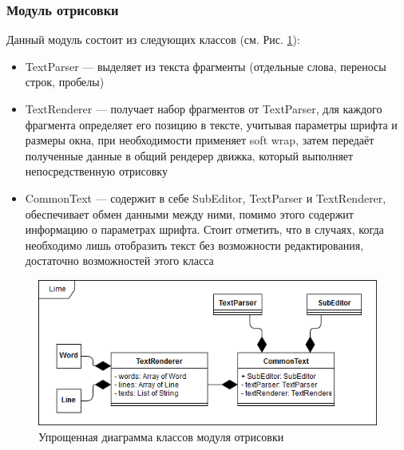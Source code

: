 \documentclass{fefu}
\begin{document}
			\subsubsection{Модуль отрисовки}
				\par Данный модуль состоит из следующих классов (см. Рис. 
				\ref{diag:RendererScheme}):
				\begin{itemize}
					\item TextParser --- выделяет из текста фрагменты (отдельные слова, 
					переносы строк, пробелы)
					\item TextRenderer --- получает набор фрагментов от TextParser, для каждого
					фрагмента определяет его позицию в тексте, учитывая параметры шрифта и 
					размеры окна, при необходимости применяет soft wrap, затем передаёт
					полученные данные в общий рендерер движка, который выполняет
					непосредственную отрисовку
					\item CommonText --- содержит в себе SubEditor, TextParser и TextRenderer,
					обеспечивает обмен данными между ними, помимо этого содержит информацию о
					параметрах шрифта. Стоит отметить, что в случаях, когда необходимо лишь 
					отобразить текст без возможности редактирования, достаточно возможностей
					этого класса
				\end{itemize}
				\begin{figure}[h]
					\centering
					\includegraphics[width=1\linewidth]{diagrams/RendererScheme.png}
					\caption{Упрощенная диаграмма классов модуля отрисовки}
					\label{diag:RendererScheme}
				\end{figure}
\end{document}
